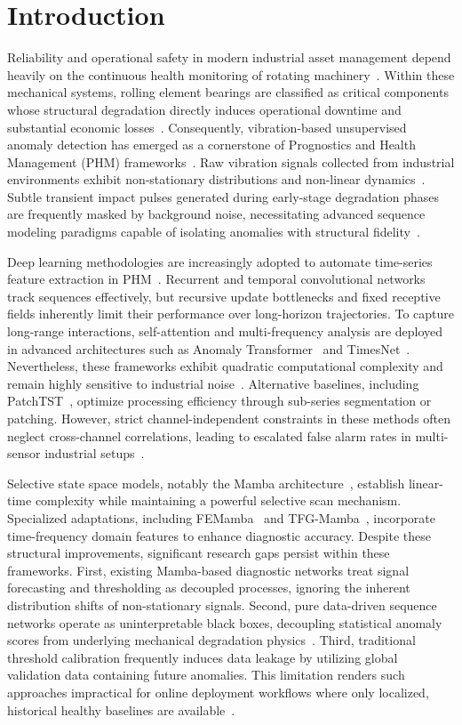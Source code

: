 \documentclass[cmes,article,submit,moreauthors,pdftex]{Definitions/tsp}
\begin{document}
\section{Introduction} \label{sect:s1}
Reliability and operational safety in modern industrial asset management depend heavily on the continuous health monitoring of rotating machinery~\cite{ref-1}. Within these mechanical systems, rolling element bearings are classified as critical components whose structural degradation directly induces operational downtime and substantial economic losses~\cite{ref-1}. Consequently, vibration-based unsupervised anomaly detection has emerged as a cornerstone of Prognostics and Health Management (PHM) frameworks~\cite{ref-1}. Raw vibration signals collected from industrial environments exhibit non-stationary distributions and non-linear dynamics~\cite{ref-1}. Subtle transient impact pulses generated during early-stage degradation phases are frequently masked by background noise, necessitating advanced sequence modeling paradigms capable of isolating anomalies with structural fidelity~\cite{ref-1}.

Deep learning methodologies are increasingly adopted to automate time-series feature extraction in PHM~\cite{ref-1}. Recurrent and temporal convolutional networks track sequences effectively, but recursive update bottlenecks and fixed receptive fields inherently limit their performance over long-horizon trajectories. To capture long-range interactions, self-attention and multi-frequency analysis are deployed in advanced architectures such as Anomaly Transformer~\cite{ref-2} and TimesNet~\cite{ref-3}. Nevertheless, these frameworks exhibit quadratic computational complexity and remain highly sensitive to industrial noise~\cite{ref-1}. Alternative baselines, including PatchTST~\cite{ref-4}, optimize processing efficiency through sub-series segmentation or patching. However, strict channel-independent constraints in these methods often neglect cross-channel correlations, leading to escalated false alarm rates in multi-sensor industrial setups~\cite{ref-4}.

Selective state space models, notably the Mamba architecture~\cite{ref-5}, establish linear-time complexity while maintaining a powerful selective scan mechanism. Specialized adaptations, including FEMamba~\cite{ref-6} and TFG-Mamba~\cite{ref-7}, incorporate time-frequency domain features to enhance diagnostic accuracy. Despite these structural improvements, significant research gaps persist within these frameworks. First, existing Mamba-based diagnostic networks treat signal forecasting and thresholding as decoupled processes, ignoring the inherent distribution shifts of non-stationary signals. Second, pure data-driven sequence networks operate as uninterpretable black boxes, decoupling statistical anomaly scores from underlying mechanical degradation physics~\cite{ref-8}. Third, traditional threshold calibration frequently induces data leakage by utilizing global validation data containing future anomalies. This limitation renders such approaches impractical for online deployment workflows where only localized, historical healthy baselines are available~\cite{ref-9}.
\end{document}
